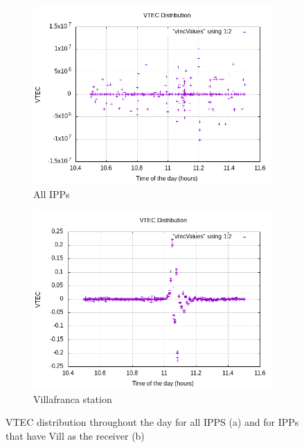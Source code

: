 \begin{figure}[!htb]
	\begin{subfigure}[b]{0.5\textwidth}
		\includegraphics[width=\linewidth]{images/ch4/vtecDistributionGeneral.png}
		\caption{All IPPs}
	\end{subfigure}
	\hfill
	\begin{subfigure}[b]{0.5\textwidth}
		\includegraphics[width=\linewidth]{images/ch4/vtecDistributionVill.png}
		\caption{Villafranca station}
	\end{subfigure}
	\caption{VTEC distribution throughout the day for all IPPS (a) and for IPPs that have Vill as the receiver (b)}
	\label{fig:vtecDistribution}
\end{figure}

